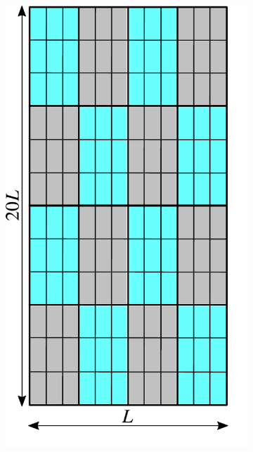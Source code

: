 \begin{figure} [htbp]
\begin{subfigure}[t]{0.22\textwidth}
  \centerline{\includegraphics[width=\linewidth]{figs/FE_12x12_a}}
  \caption{\label{fig:fem_demo_grid}}
\end{subfigure}
\hfill
\begin{subfigure}[t]{0.22\textwidth}

\end{subfigure}
\end{figure}
